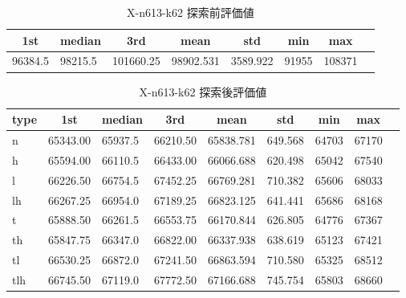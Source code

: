 \begin{table}[htbp]
    \caption{X-n613-k62 探索前評価値}
    \begin{tabular}{|l|l|l|l|l|l|l|l|}\hline
    \multicolumn{1}{|c|}{\textbf{1st}}
    &\multicolumn{1}{c|}{\textbf{median}}
    &\multicolumn{1}{c|}{\textbf{3rd}}
    &\multicolumn{1}{c|}{\textbf{mean}}
    &\multicolumn{1}{c|}{\textbf{std}}
    &\multicolumn{1}{c|}{\textbf{min}}
    &\multicolumn{1}{c|}{\textbf{max}}\\\hline
	96384.5 & 98215.5 & 101660.25 & 98902.531 & 3589.922 & 91955 & 108371\\\hline
	\end{tabular}
\end{table}
\begin{table}[htbp]
    \caption{X-n613-k62 探索後評価値}
    \begin{tabular}{|l|l|l|l|l|l|l|l|l|}\hline
    \multicolumn{1}{|c|}{\textbf{type}}
    &\multicolumn{1}{|c|}{\textbf{1st}}
    &\multicolumn{1}{c|}{\textbf{median}}
    &\multicolumn{1}{c|}{\textbf{3rd}}
    &\multicolumn{1}{c|}{\textbf{mean}}
    &\multicolumn{1}{c|}{\textbf{std}}
    &\multicolumn{1}{c|}{\textbf{min}}
    &\multicolumn{1}{c|}{\textbf{max}}\\\hline
	n & 65343.00 & 65937.5 & 66210.50 & 65838.781 & 649.568 & 64703 & 67170\\\hline
	h & 65594.00 & 66110.5 & 66433.00 & 66066.688 & 620.498 & 65042 & 67540\\\hline
	l & 66226.50 & 66754.5 & 67452.25 & 66769.281 & 710.382 & 65606 & 68033\\\hline
	lh & 66267.25 & 66954.0 & 67189.25 & 66823.125 & 641.441 & 65686 & 68168\\\hline
	t & 65888.50 & 66261.5 & 66553.75 & 66170.844 & 626.805 & 64776 & 67367\\\hline
	th & 65847.75 & 66347.0 & 66822.00 & 66337.938 & 638.619 & 65123 & 67421\\\hline
	tl & 66530.25 & 66872.0 & 67241.50 & 66863.594 & 710.580 & 65325 & 68512\\\hline
	tlh & 66745.50 & 67119.0 & 67772.50 & 67166.688 & 745.754 & 65803 & 68660\\\hline
	\end{tabular}
\end{table}
